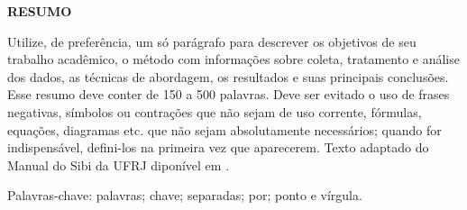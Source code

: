 \newpage
\thispagestyle{empty}
\begin{center}
	\textbf{\MakeUppercase{Resumo}}
\end{center}

\noindent
Utilize, de preferência, um só parágrafo para descrever os objetivos de seu trabalho acadêmico, o método com informações sobre coleta, tratamento e análise dos dados, as técnicas de abordagem, os resultados e suas principais conclusões. Esse resumo deve conter de 150 a 500 palavras. Deve ser evitado o uso de frases negativas, símbolos ou contrações que não sejam de uso corrente, fórmulas, equações, diagramas etc. que não sejam absolutamente
necessários; quando for indispensável, defini-los na primeira vez que aparecerem. Texto adaptado do Manual do Sibi da UFRJ diponível em \cite{ManualSibi2025}.

\vspace{1em}
\noindent
Palavras-chave: palavras; chave; separadas; por; ponto e vírgula.